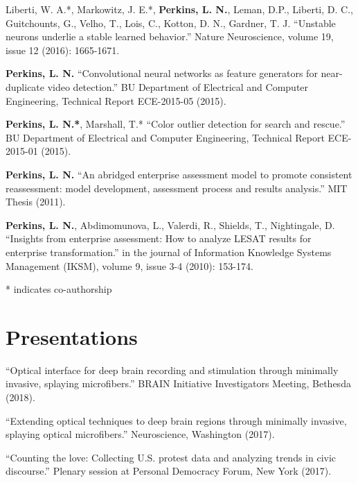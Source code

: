 \bigskip

\noindent
Liberti, W. A.*, Markowitz, J. E.*, \textbf{Perkins, L. N.}, Leman, D.P., Liberti, D. C., Guitchounts, G., Velho, T., Lois, C., Kotton, D. N., Gardner, T. J. ``Unstable neurons underlie a stable learned behavior.'' Nature Neuroscience, volume 19, issue 12 (2016): 1665-1671.

\bigskip

\noindent
\textbf{Perkins, L. N.} ``Convolutional neural networks as feature generators for near-duplicate video detection.'' BU Department of Electrical and Computer Engineering, Technical Report ECE-2015-05 (2015).

\bigskip

\noindent
\textbf{Perkins, L. N.*}, Marshall, T.* ``Color outlier detection for search and rescue.'' BU Department of Electrical and Computer Engineering, Technical Report ECE-2015-01 (2015).

\bigskip

\noindent
\textbf{Perkins, L. N.} ``An abridged enterprise assessment model to promote consistent reassessment: model development, assessment process and results analysis.'' MIT Thesis (2011).

\bigskip

\noindent
\textbf{Perkins, L. N.}, Abdimomunova, L., Valerdi, R., Shields, T., Nightingale, D. ``Insights from enterprise assessment: How to analyze LESAT results for enterprise transformation.'' in the journal of Information Knowledge Systems Management (IKSM), volume 9, issue 3-4 (2010): 153-174.

\bigskip

\noindent
* indicates co-authorship

\section*{Presentations}

``Optical interface for deep brain recording and stimulation through minimally invasive, splaying microfibers.'' BRAIN Initiative Investigators Meeting, Bethesda (2018).

\bigskip

\noindent
``Extending optical techniques to deep brain regions through minimally invasive, splaying optical microfibers.'' Neuroscience, Washington (2017).

\bigskip

\noindent
``Counting the love: Collecting U.S. protest data and analyzing trends in civic discourse.'' Plenary session at Personal Democracy Forum, New York (2017).

